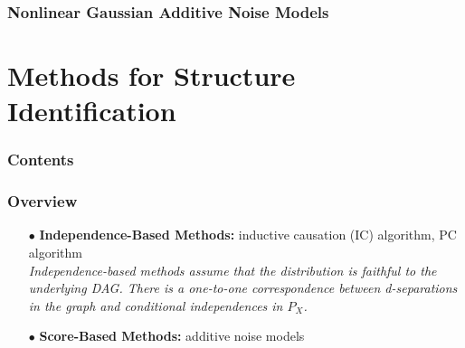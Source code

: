 \documentclass{beamer}
\begin{document}
\begin{frame}
    \frametitle{Nonlinear Gaussian Additive Noise Models}
\end{frame}

\section{Methods for Structure Identification}

\begin{frame}
    \frametitle{Contents}
    \tableofcontents[currentsection]
\end{frame}

\begin{frame}
    \frametitle{Overview}
    \begin{itemize}
        \item[$\bullet$] \textbf{Independence-Based Methods:} inductive causation (IC) algorithm, PC algorithm \\
        \emph{Independence-based methods assume that the distribution is faithful to the underlying DAG. There is a one-to-one 
        correspondence between d-separations in the graph and conditional independences in $P_X$.}
    \end{itemize}
    \begin{itemize}
        \item[$\bullet$] \textbf{Score-Based Methods:} additive noise models
    \end{itemize}
\end{frame}
\end{document}
